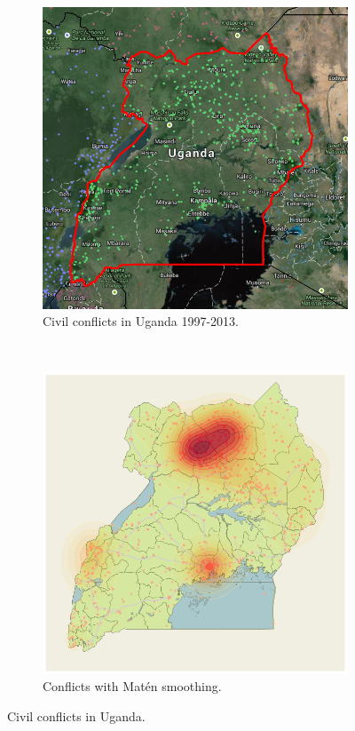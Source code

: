 \documentclass{article} %
\begin{document}
\begin{figure}
  \centering
  \begin{subfigure}[b]{0.5\textwidth}
    \centering
    \includegraphics[width=\textwidth]{figures/uganda}
    \caption{Civil conflicts in Uganda 1997-2013.}
    \label{fig:map-points}
  \end{subfigure}~\begin{subfigure}[b]{0.5\textwidth}
    \centering
    \includegraphics[width=\textwidth]{figures/map-with-smoothed-data}
    \caption{Conflicts with Mat\'{e}n smoothing.}
    \label{fig:map-smoothed}
  \end{subfigure}
  \caption{Civil conflicts in Uganda.}
  \label{fig:map}
\end{figure}
\end{document}
